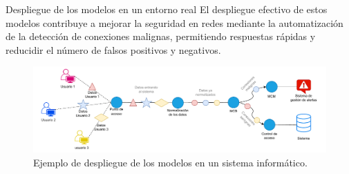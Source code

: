 \begin{frame}{Despliegue de los modelos en un entorno real}
El despliegue efectivo de estos modelos contribuye a mejorar la seguridad en redes mediante la automatización de la detección de conexiones malignas, permitiendo respuestas rápidas y reducidir el número de falsos positivos y negativos. %

\begin{figure}[H]
    \centering
    \includegraphics[width=1\textwidth]{../Memoria/img/despliegue/despliegue.pdf}
    \caption{Ejemplo de despliegue de los modelos en un sistema informático.}
    \label{fig:despliegue}
\end{figure}

\end{frame}